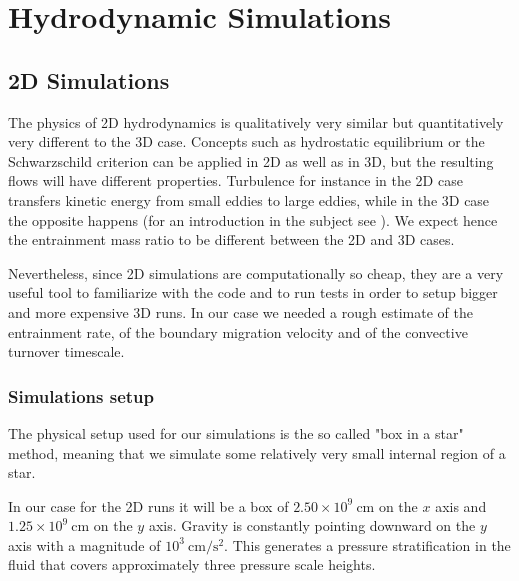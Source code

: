 
\chapter{Hydrodynamic Simulations}
\section{2D Simulations}
The physics of 2D hydrodynamics is qualitatively very similar but quantitatively very different to the 3D case. Concepts such as hydrostatic equilibrium or the Schwarzschild criterion can be applied in 2D as well as in 3D, but the resulting flows will have different properties. Turbulence for instance in the 2D case transfers kinetic energy from small eddies to large eddies, while in the 3D case the opposite happens (for an introduction in the subject see \citet{boffetta}). We expect hence the entrainment mass ratio to be different between the 2D and 3D cases. 

Nevertheless, since 2D simulations are computationally so cheap, they are a very useful tool to familiarize with the code and to run tests in order to setup bigger and more expensive 3D runs. In our case we needed a rough estimate of the entrainment rate, of the boundary migration velocity and of the convective turnover timescale. 
	
\subsection{Simulations setup}
The physical setup used for our simulations is the so called "box in a star" method, meaning that we simulate some relatively very small internal region of a star. 

In our case for the 2D runs it will be a box of $2.50 \times 10^{9} \ \mathrm{cm}$ on the $x$ axis and $1.25 \times 10^{9} \ \mathrm{cm}$ on the $y$ axis. Gravity is constantly pointing downward on the $y$ axis with a magnitude of $10^3 \ \mathrm{cm/s^2}$. This generates a pressure stratification in the fluid that covers approximately three pressure scale heights. 

